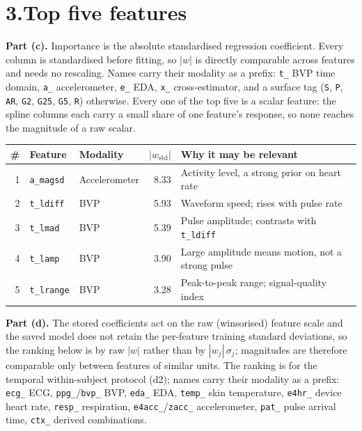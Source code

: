 \documentclass[10pt,a4paper]{article}
\newcommand{\feat}[1]{\texttt{\small #1}}
\begin{document}
\section*{3.\quad Top five features}

\textbf{Part (c).} Importance is the absolute standardised regression coefficient.
Every column is standardised before fitting, so $|w|$ is directly comparable across
features and needs no rescaling. Names carry their modality as a prefix: \feat{t\_}
BVP time domain, \feat{a\_} accelerometer, \feat{e\_} EDA, \feat{x\_}
cross-estimator, and a surface tag (\feat{S}, \feat{P}, \feat{AR}, \feat{G2},
\feat{G25}, \feat{G5}, \feat{R}) otherwise. Every one of the top five is a scalar
feature: the spline columns each carry a small share of one feature's response, so
none reaches the magnitude of a raw scalar.

\begin{table}[h]
\centering\small
\begin{tabular}{@{}rllr p{5.4cm}@{}}
\toprule
\# & \textbf{Feature} & \textbf{Modality} & $|w_{\text{std}}|$ & \textbf{Why it may be relevant} \\
\midrule
1 & \feat{a\_magsd} & Accelerometer & 8.33 & Activity level, a strong prior on heart rate \\
2 & \feat{t\_ldiff} & BVP & 5.93 & Waveform speed; rises with pulse rate \\
3 & \feat{t\_lmad} & BVP & 5.39 & Pulse amplitude; contrasts with \feat{t\_ldiff} \\
4 & \feat{t\_lamp} & BVP & 3.90 & Large amplitude means motion, not a strong pulse \\
5 & \feat{t\_lrange} & BVP & 3.28 & Peak-to-peak range; signal-quality index \\
\bottomrule
\end{tabular}
\end{table}


\textbf{Part (d).} The stored coefficients act on the raw (winsorised) feature
scale and the saved model does not retain the per-feature training standard
deviations, so the ranking below is by raw $|w|$ rather than by
$|w_j|\,\sigma_j$; magnitudes are therefore comparable only between features of
similar units. The ranking is for the temporal within-subject protocol (d2); names carry their modality as a prefix:
\feat{ecg\_} ECG, \feat{ppg\_}/\feat{bvp\_} BVP, \feat{eda\_} EDA,
\feat{temp\_} skin temperature, \feat{e4hr\_} device heart rate,
\feat{resp\_} respiration, \feat{e4acc\_}/\feat{zacc\_} accelerometer,
\feat{pat\_} pulse arrival time, \feat{ctx\_} derived combinations.
\end{document}
